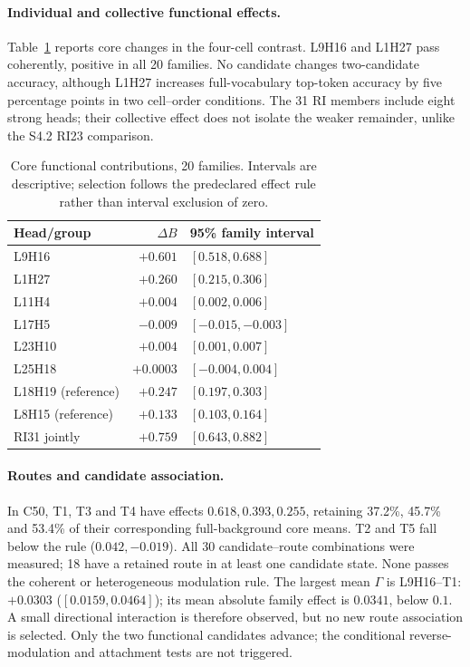 \paragraph{Individual and collective functional effects.}
Table~\ref{tab:s44-functional} reports core changes in the four-cell contrast.
L9H16 and L1H27 pass coherently, positive in all 20 families. No candidate changes
two-candidate accuracy, although L1H27 increases full-vocabulary top-token
accuracy by five percentage points in two cell--order conditions.
The 31 RI members include eight strong heads; their collective effect does not
isolate the weaker remainder, unlike the S4.2 RI23 comparison.

\begin{table}[t]
\centering\scriptsize
\begin{tabular}{@{}lrl@{}}
\toprule
Head/group & $\Delta B$ & 95\% family interval \\
\midrule
L9H16 & $+0.601$ & $[0.518,0.688]$ \\
L1H27 & $+0.260$ & $[0.215,0.306]$ \\
L11H4 & $+0.004$ & $[0.002,0.006]$ \\
L17H5 & $-0.009$ & $[-0.015,-0.003]$ \\
L23H10 & $+0.004$ & $[0.001,0.007]$ \\
L25H18 & $+0.0003$ & $[-0.004,0.004]$ \\
L18H19 (reference) & $+0.247$ & $[0.197,0.303]$ \\
L8H15 (reference) & $+0.133$ & $[0.103,0.164]$ \\
RI31 jointly & $+0.759$ & $[0.643,0.882]$ \\
\bottomrule
\end{tabular}
\caption{Core functional contributions, 20 families. Intervals are descriptive;
selection follows the predeclared effect rule rather than interval exclusion of zero.}
\label{tab:s44-functional}
\end{table}

\paragraph{Routes and candidate association.}
In C50, T1, T3 and T4 have effects $0.618,0.393,0.255$, retaining 37.2\%, 45.7\%
and 53.4\% of their corresponding full-background core means. T2 and T5 fall
below the rule ($0.042,-0.019$). All 30 candidate--route combinations were
measured; 18 have a retained route in at least one candidate state. None passes
the coherent or heterogeneous modulation rule. The largest mean $\Gamma$ is
L9H16--T1: $+0.0303$ ($[0.0159,0.0464]$); its mean absolute family effect is
$0.0341$, below $0.1$. A small directional interaction is therefore observed,
but no new route association is selected. Only the two functional candidates
advance; the conditional reverse-modulation and attachment tests are not triggered.

